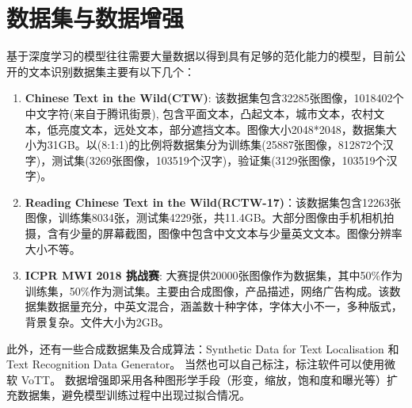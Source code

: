 \section{数据集与数据增强}
基于深度学习的模型往往需要大量数据以得到具有足够的范化能力的模型，目前公开的文本识别数据集主要有以下几个：
\begin{enumerate}
	\item \textbf{Chinese Text in the Wild(CTW)\cite{yuan2019ctw}}: 该数据集包含32285张图像，1018402个中文字符(来自于腾讯街景), 包含平面文本，凸起文本，城市文本，农村文本，低亮度文本，远处文本，部分遮挡文本。图像大小2048*2048，数据集大小为31GB。以(8:1:1)的比例将数据集分为训练集(25887张图像，812872个汉字)，测试集(3269张图像，103519个汉字)，验证集(3129张图像，103519个汉字)。
	\item \textbf{Reading Chinese Text in the Wild(RCTW-17)\cite{ICDAR2017}}：该数据集包含12263张图像，训练集8034张，测试集4229张，共11.4GB。大部分图像由手机相机拍摄，含有少量的屏幕截图，图像中包含中文文本与少量英文文本。图像分辨率大小不等。
	\item \textbf{ICPR MWI 2018 挑战赛}: 大赛提供20000张图像作为数据集，其中50\%作为训练集，50\%作为测试集。主要由合成图像，产品描述，网络广告构成。该数据集数据量充分，中英文混合，涵盖数十种字体，字体大小不一，多种版式，背景复杂。文件大小为2GB。
\end{enumerate}

此外，还有一些合成数据集及合成算法：Synthetic Data for Text Localisation 和 Text Recognition Data Generator。
当然也可以自己标注，标注软件可以使用微软 VoTT。
数据增强即采用各种图形学手段（形变，缩放，饱和度和曝光等）扩充数据集，避免模型训练过程中出现过拟合情况。

